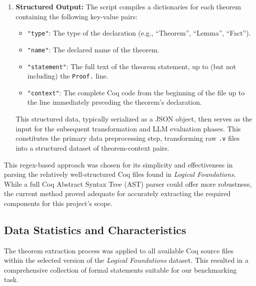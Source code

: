 \begin{enumerate}
    \item \textbf{Structured Output:} The script compiles a dictionaries for each theorem containing the following key-value pairs:
    \begin{itemize}
        \item \texttt{"type"}: The type of the declaration (e.g., ``Theorem'', ``Lemma'', ``Fact'').
        \item \texttt{"name"}: The declared name of the theorem.
        \item \texttt{"statement"}: The full text of the theorem statement, up to (but not including) the \texttt{Proof.} line.
        \item \texttt{"context"}: The complete Coq code from the beginning of the file up to the line immediately preceding the theorem's declaration.
    \end{itemize}
    This structured data, typically serialized as a JSON object, then serves as the input for the subsequent transformation and LLM evaluation phases. This constitutes the primary data preprocessing step, transforming raw \texttt{.v} files into a structured dataset of theorem-context pairs.
\end{enumerate}

This regex-based approach was chosen for its simplicity and effectiveness in parsing the relatively well-structured Coq files found in \emph{Logical Foundations}. While a full Coq Abstract Syntax Tree (AST) parser could offer more robustness, the current method proved adequate for accurately extracting the required components for this project's scope.

\subsection{Data Statistics and Characteristics}
\label{sec:data_statistics}

The theorem extraction process was applied to all available Coq source files within the selected version of the \emph{Logical Foundations} dataset. This resulted in a comprehensive collection of formal statements suitable for our benchmarking task.

